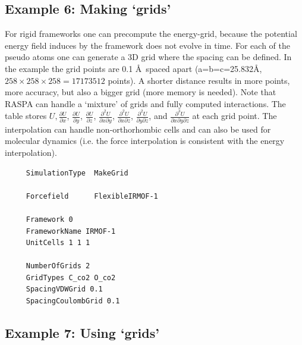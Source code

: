 \subsection*{Example 6: Making `grids'}

For rigid frameworks one can precompute the energy-grid, because the potential energy field induces by the framework does
not evolve in time. For each of the pseudo atoms one can generate a 3D grid where the spacing can be defined. In the example
the grid points are 0.1 \AA\ spaced apart (a=b=c=25.832\AA, $258\times258\times258=17173512$ points). 
A shorter distance results in more points, more accuracy, but also a bigger
grid (more memory is needed). Note that RASPA can handle a `mixture' of grids and fully computed interactions.
The table stores $U,\frac{\partial U}{\partial x}$, $\frac{\partial U}{\partial y}$, $\frac{\partial U}{\partial z}$,
$\frac{\partial^2 U}{\partial x\partial y}$, $\frac{\partial^2 U}{\partial x\partial z}$, $\frac{\partial^2 U}{\partial y\partial z}$,
and $\frac{\partial^3 U}{\partial x\partial y \partial z}$ at each grid point. The interpolation can handle non-orthorhombic cells
and can also be used for molecular dynamics (i.e. the force interpolation is consistent with the energy interpolation).

\begin{tiny}
\begin{verbatim}
     SimulationType  MakeGrid

     Forcefield      FlexibleIRMOF-1

     Framework 0
     FrameworkName IRMOF-1
     UnitCells 1 1 1

     NumberOfGrids 2
     GridTypes C_co2 O_co2
     SpacingVDWGrid 0.1
     SpacingCoulombGrid 0.1
\end{verbatim}
\end{tiny}

\subsection*{Example 7: Using `grids'}

